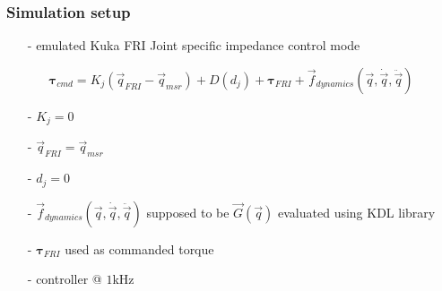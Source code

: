 \begin{frame}
  \frametitle{Simulation setup}
  \begin{itemize}
  \item[-] emulated Kuka FRI Joint specific impedance control mode
    \begin{itemize}
    \item[] $\boldsymbol{\tau}_{cmd} = K_j(\vec{q}_{FRI} - \vec{q}_{msr}) + D(d_{j}) + \boldsymbol{\tau}_{FRI} + \vec{f}_{dynamics}(\vec{q}, \dot{\vec{q}}, \ddot{\vec{q}})$
    \end{itemize}
  \item[-] $K_j = 0$
  \item[-] $\vec{q}_{FRI} = \vec{q}_{msr}$
  \item[-] $d_{j} = 0$
  \item[-] $\vec{f}_{dynamics}(\vec{q}, \dot{\vec{q}}, \ddot{\vec{q}})$ supposed to be $\vec{G}(\vec{q})$ evaluated using KDL library
  \item[-] $\boldsymbol{\tau}_{FRI}$ used as commanded torque
  \item[-] controller @ $1$kHz
  \end{itemize}

\end{frame}

